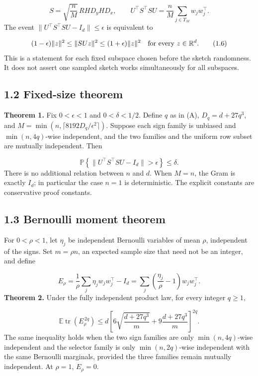 \documentclass[11pt,a4paper]{article}
\begin{document}
\begin{equation}
S=\sqrt{\frac nM}\,RHD_yHD_x,\qquad
U^\top S^\top SU=\frac nM\sum_{j\in T_M}w_jw_j^\top .
\tag{1.5}
\end{equation}
The event \(\|U^\top S^\top SU-I_d\|\le\epsilon\) is equivalent to

\begin{equation}
(1-\epsilon)\|z\|^2\le\|SUz\|^2\le(1+\epsilon)\|z\|^2
\quad\hbox{for every }z\in\mathbb R^d .
\tag{1.6}
\end{equation}
This is a statement for each fixed subspace chosen before the sketch randomness. It does not assert one sampled sketch works simultaneously for all subspaces.

\subsection*{1.2 Fixed-size theorem}
\textbf{Theorem 1.} Fix \(0<\epsilon<1\) and \(0<\delta<1/2\). Define \(q\) as in (A), \(D_q=d+27q^3\), and \(M=\min(n,\lceil8192D_q/\epsilon^2\rceil)\). Suppose each sign family is unbiased and \(\min(n,4q)\)-wise independent, and the two families and the uniform row subset are mutually independent. Then

\begin{equation}
\mathbb P\!\left\{\|U^\top S^\top SU-I_d\|>\epsilon\right\}\le\delta .
\tag{1.7}
\end{equation}
There is no additional relation between \(n\) and \(d\). When \(M=n\), the Gram is exactly \(I_d\); in particular the case \(n=1\) is deterministic. The explicit constants are conservative proof constants.

\subsection*{1.3 Bernoulli moment theorem}
For \(0<\rho<1\), let \(\eta_j\) be independent Bernoulli variables of mean \(\rho\), independent of the signs. Set \(m=\rho n\), an expected sample size that need not be an integer, and define

\begin{equation}
E_\rho=\frac1\rho\sum_j\eta_jw_jw_j^\top-I_d
       =\sum_j\left(\frac{\eta_j}{\rho}-1\right)w_jw_j^\top .
\tag{1.8}
\end{equation}
\textbf{Theorem 2.} Under the fully independent product law, for every integer \(q\ge1\),

\begin{equation}
\mathbb E\operatorname{tr}(E_\rho^{\,2q})
\le d\left[
6\sqrt{\frac{d+27q^3}{m}}+
9\frac{d+27q^3}{m}
\right]^{2q}.
\tag{1.9}
\end{equation}
The same inequality holds when the two sign families are only \(\min(n,4q)\)-wise independent and the selector family is only \(\min(n,2q)\)-wise independent with the same Bernoulli marginals, provided the three families remain mutually independent. At \(\rho=1\), \(E_\rho=0\).
\end{document}
